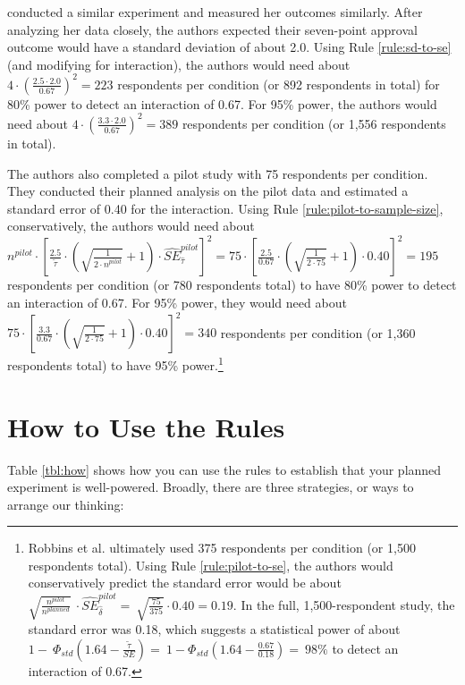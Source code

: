 \documentclass[12pt]{article}
\begin{document}
\cite{Myrick2020} conducted a similar experiment and measured her outcomes similarly. After analyzing her data closely, the authors expected their seven-point approval outcome would have a standard deviation of about 2.0. 
Using Rule \ref{rule:sd-to-se} (and modifying for interaction), the authors would need about $4 \cdot \left( \frac{2.5 \cdot 2.0}{0.67} \right)^{2} = 223$ respondents per condition (or 892 respondents in total) for 80\% power to detect an interaction of 0.67. 
For 95\% power, the authors would need about $4 \cdot \left( \frac{3.3 \cdot 2.0}{0.67} \right)^{2} = 389$ respondents per condition (or 1,556 respondents in total).

The authors also completed a pilot study with 75 respondents per condition. 
They conducted their planned analysis on the pilot data and estimated a standard error of 0.40 for the interaction. 
Using Rule \ref{rule:pilot-to-sample-size}, conservatively, the authors would need about $n^{pilot} \cdot \left\lbrack \frac{2.5}{\widetilde{\tau}} \cdot \left( \sqrt{\frac{1}{{2 \cdot n}^{pilot}}} + 1 \right) \cdot {\widehat{SE}}_{\widehat{\tau}}^{pilot} \right\rbrack^{2} = 75 \cdot \left\lbrack \frac{2.5}{0.67} \cdot \left( \sqrt{\frac{1}{2 \cdot 75}} + 1 \right) \cdot 0.40 \right\rbrack^{2} = 195$ respondents per condition (or 780 respondents total) to have 80\% power to detect an interaction of 0.67. 
For 95\% power, they would need about $75 \cdot \left\lbrack \frac{3.3}{0.67} \cdot \left( \sqrt{\frac{1}{2 \cdot 75}} + 1 \right) \cdot 0.40 \right\rbrack^{2} = 340$ respondents per condition (or 1,360 respondents total) to have 95\% power.\footnote{
  Robbins et al. ultimately used 375 respondents per condition (or 1,500 respondents total). 
  Using Rule \ref{rule:pilot-to-se}, the authors would conservatively predict the standard error would be about $\sqrt{\frac{n^{pilot}}{n^{planned}}}\  \cdot {\widehat{SE}}_{\widehat{\delta}}^{pilot} = \ \sqrt{\frac{75}{375}} \cdot 0.40 = 0.19$.
  In the full, 1,500-respondent study, the standard error was 0.18, which suggests a statistical power of about $1 - \ \Phi_{std}\left( 1.64 - \frac{\widetilde{\tau}}{SE} \right) = \ 1 - \Phi_{std}\left( 1.64 - \frac{0.67}{0.18} \right) = \ 98\%$ to detect an interaction of 0.67.
  }

\section*{How to Use the Rules}

Table \ref{tbl:how} shows how you can use the rules to establish that your planned experiment is well-powered. Broadly, there are three strategies, or ways to arrange our thinking:
\end{document}
